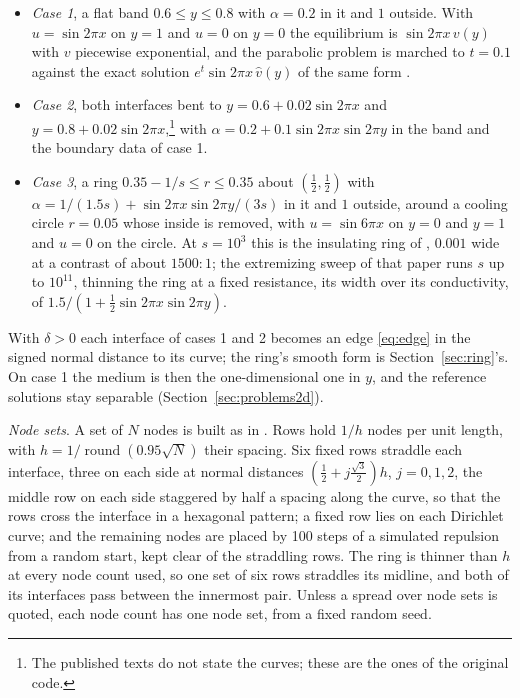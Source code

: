 \documentclass[11pt]{amsart}
\theoremstyle{definition}
\theoremstyle{remark}
\newcommand{\para}[1]{\par\smallskip\noindent\textit{#1}.\enspace}
\begin{document}
\begin{itemize}
\item \emph{Case 1}, a flat band $0.6 \le y \le 0.8$ with $\alpha = 0.2$ in
  it and $1$ outside. With $u = \sin 2\pi x$ on $y = 1$ and $u = 0$ on
  $y = 0$ the equilibrium is $\sin 2\pi x\, v(y)$ with $v$ piecewise
  exponential, and the parabolic problem is marched to $t = 0.1$ against the
  exact solution $e^t \sin 2\pi x\, \hat v(y)$ of the same form
  \cite{MartinFornberg2017heat}.
\item \emph{Case 2}, both interfaces bent to $y = 0.6 + 0.02 \sin 2\pi x$
  and $y = 0.8 + 0.02 \sin 2\pi x$,\footnote{The published texts do not
  state the curves; these are the ones of the original code.} with
  $\alpha = 0.2 + 0.1 \sin 2\pi x \sin 2\pi y$ in the band and the boundary
  data of case 1.
\item \emph{Case 3}, a ring $0.35 - 1/s \le r \le 0.35$ about
  $(\tfrac12, \tfrac12)$ with $\alpha = 1/(1.5 s) + \sin 2\pi x \sin 2\pi y
  / (3 s)$ in it and $1$ outside, around a cooling circle $r = 0.05$ whose
  inside is removed, with $u = \sin 6\pi x$ on $y = 0$ and $y = 1$ and
  $u = 0$ on the circle. At $s = 10^3$ this is the insulating ring of
  \cite{MartinFornberg2017heat}, $0.001$ wide at a contrast of about
  $1500 : 1$; the extremizing sweep of that paper runs $s$ up to $10^{11}$,
  thinning the ring at a fixed resistance, its width over its conductivity,
  of $1.5 / (1 + \tfrac12 \sin 2\pi x \sin 2\pi y)$.
\end{itemize}
With $\delta > 0$ each interface of cases 1 and 2 becomes an edge
\eqref{eq:edge} in the signed normal distance to its curve; the ring's
smooth form is Section~\ref{sec:ring}'s. On case 1 the medium is then the
one-dimensional one in $y$, and the reference solutions stay separable
(Section~\ref{sec:problems2d}).

\para{Node sets}
A set of $N$ nodes is built as in \cite{MartinFornberg2017heat}. Rows hold
$1/h$ nodes per unit length, with $h = 1 / \operatorname{round}(0.95 \sqrt N)$
their spacing. Six fixed rows straddle each interface, three on each
side at normal distances $(\tfrac12 + j \tfrac{\sqrt 3}{2}) h$,
$j = 0, 1, 2$, the middle row on each side staggered by half a spacing
along the curve, so that the rows cross the interface in a hexagonal
pattern; a fixed row
lies on each Dirichlet curve; and the remaining nodes are placed by 100
steps of a simulated repulsion from a random start, kept clear of the
straddling rows. The ring is thinner than $h$ at every node count used, so
one set of six rows straddles its midline, and both of its interfaces pass
between the innermost pair. Unless a spread over node sets is quoted,
each node count has one node set, from a fixed random seed.
\end{document}
